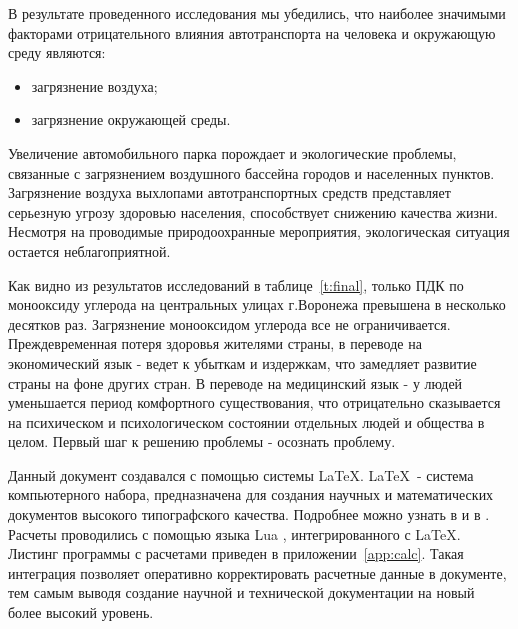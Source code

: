 В результате проведенного исследования мы убедились, что наиболее значимыми факторами отрицательного влияния автотранспорта на человека и окружающую среду являются:
\begin{itemize}
\item загрязнение воздуха;
\item загрязнение окружающей среды.
\end{itemize}

Увеличение автомобильного парка порождает и экологические проблемы, связанные с загрязнением воздушного бассейна городов и населенных пунктов. Загрязнение воздуха выхлопами автотранспортных средств представляет серьезную угрозу здоровью населения, способствует снижению качества жизни. Несмотря на проводимые природоохранные мероприятия, экологическая ситуация остается неблагоприятной.

Как видно из результатов исследований в таблице~\ref{t:final}, только ПДК по монооксиду углерода на центральных улицах г.Воронежа превышена в несколько десятков раз. Загрязнение монооксидом углерода все не ограничивается. Преждевременная
потеря здоровья жителями страны, в переводе на экономический язык - ведет к убыткам и издержкам, что замедляет развитие страны на фоне других стран. В переводе на медицинский язык - у людей уменьшается период комфортного существования, что отрицательно сказывается на психическом и психологическом состоянии отдельных людей и общества в целом. Первый шаг к решению проблемы - осознать проблему.

Данный документ создавался с помощью системы \LaTeX. \LaTeX\ - система компьютерного набора, предназначена для создания научных и математических документов высокого типографского качества. Подробнее можно узнать в \cite{Lvovsky} и в \cite{eskdi}. Расчеты проводились с помощью языка Lua \cite{Ierusalimschy}, интегрированного с \LaTeX. Листинг программы с расчетами приведен в приложении~\ref{app:calc}. Такая интеграция позволяет оперативно корректировать расчетные данные в документе, тем самым выводя создание научной и технической документации на новый более высокий уровень.




